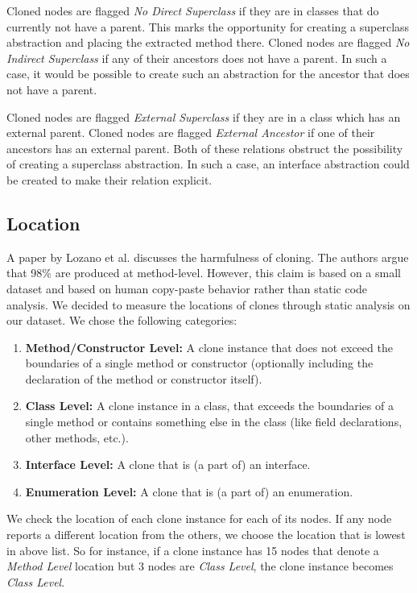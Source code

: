 Cloned nodes are flagged \textit{No Direct Superclass} if they are in classes that do currently not have a parent. This marks the opportunity for creating a superclass abstraction and placing the extracted method there. Cloned nodes are flagged \textit{No Indirect Superclass} if any of their ancestors does not have a parent. In such a case, it would be possible to create such an abstraction for the ancestor that does not have a parent.

Cloned nodes are flagged \textit{External Superclass} if they are in a class which has an external parent. Cloned nodes are flagged \textit{External Ancestor} if one of their ancestors has an external parent. Both of these relations obstruct the possibility of creating a superclass abstraction. In such a case, an interface abstraction could be created to make their relation explicit.

\subsection{Location}\label{sec:setuplocation}
A paper by Lozano et al. \cite{lozano2007evaluating} discusses the harmfulness of cloning. The authors argue that 98\% are produced at method-level. However, this claim is based on a small dataset and based on human copy-paste behavior rather than static code analysis. We decided to measure the locations of clones through static analysis on our dataset. We chose the following categories:
\begin{enumerate}
  \item \textbf{Method/Constructor Level:} A clone instance that does not exceed the boundaries of a single method or constructor (optionally including the declaration of the method or constructor itself).
  \item \textbf{Class Level:} A clone instance in a class, that exceeds the boundaries of a single method or contains something else in the class (like field declarations, other methods, etc.).
  \item \textbf{Interface Level:} A clone that is (a part of) an interface.
  \item \textbf{Enumeration Level:} A clone that is (a part of) an enumeration.
\end{enumerate}
We check the location of each clone instance for each of its nodes. If any node reports a different location from the others, we choose the location that is lowest in above list. So for instance, if a clone instance has 15 nodes that denote a \textit{Method Level} location but 3 nodes are \textit{Class Level}, the clone instance becomes \textit{Class Level}.

